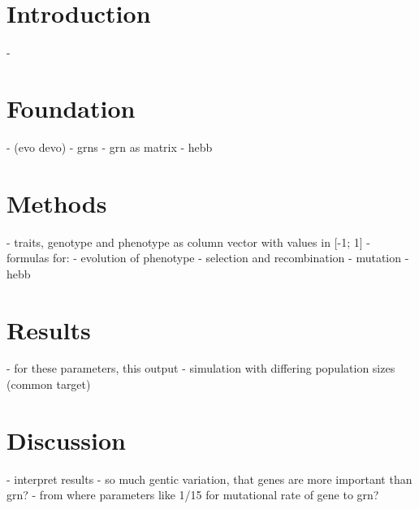 \documentclass{article}
\begin{document}


\section{Introduction}

- 

\section{Foundation}

- (evo devo)
- grns
- grn as matrix
- hebb



\section{Methods}

- traits, genotype and phenotype as column vector with values in [-1; 1]
- formulas for:
	- evolution of phenotype
	- selection and recombination
	- mutation
	- hebb



\section{Results}

- for these parameters, this output
- simulation with differing population sizes (common target)

\section{Discussion}

- interpret results
- so much gentic variation, that genes are more important than grn?
- from where parameters like 1/15 for mutational rate of gene to grn?

\newpage


\begin{appendix}
  \listoffigures
  \listoftables
\end{appendix}
\end{document}
